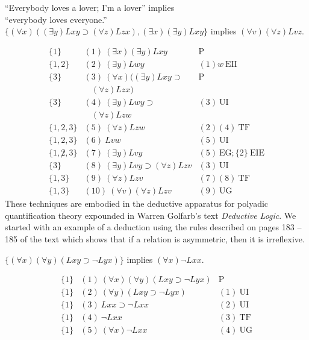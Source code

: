 \begin{center}
``Everybody loves a lover; I'm a lover'' implies \\
``everybody loves everyone.'' \\
$\{(\forall x) ((\exists y) Lxy \supset (\forall z) Lzx), (\exists x)(\exists
y) Lxy \}$ implies $(\forall v)(\forall z) Lvz.$
\end{center}
\[
\begin{array}{lll}
\{1\}   & (1)\  (\exists x)(\exists y) Lxy &  \mathrm{P}\\
\{1,2\}   & (2)\ (\exists y) Lwy  & (1)w\ \mathrm{EII}\\
\{3\}   & (3)\ (\forall x) ((\exists y) Lxy \supset   & 
\mathrm{P}\\
  &\ \ \ \  (\forall z) Lzx)  & \\
\{3\}   & (4)\ (\exists y) Lwy \supset   & (3)\ \mathrm{UI}\\
  &\ \ \ \ (\forall z) Lzw & \\
\{1,2,3\}   & (5)\ (\forall z) Lzw  & (2)(4)\ \mathrm{TF}\\
\{1,2,3\}   & (6)\ Lvw  & (5)\ \mathrm{UI}\\
\{1,\not 2,3\}   & (7)\ (\exists y) Lvy  & (5)\ \mathrm{EG};\{2\}\
\mathrm{EIE}\\ 
\{3\}   & (8)\ (\exists y) Lvy \supset (\forall z) Lzv  & (3)\ \mathrm{UI}\\
\{1,3\}   & (9)\  (\forall z) Lzv & (7)(8)\ \mathrm{TF}\\
\{1,3\}   & (10)\  (\forall v)(\forall z) Lzv & (9)\ \mathrm{UG}
\end{array}
\]
\fi
These techniques are embodied in the deductive apparatus for polyadic quantification theory expounded in Warren Golfarb's text \emph{Deductive Logic}. We started with an example of a deduction using the rules described on pages 183 -- 185 of the text
which shows that if a relation is asymmetric, then it is irreflexive.
\begin{center}
$\{(\forall x)(\forall y)(Lxy\supset\neg Lyx)\}$ implies $(\forall x)\neg Lxx.$
\end{center}
\[
\begin{array}{lll}
\{1\}   & (1)\  (\forall x)(\forall y)(Lxy\supset\neg Lyx) &  \mathrm{P}\\
\{1\}   & (2)\ (\forall y)(Lxy\supset\neg Lyx) & (1) \ \mathrm{UI}\\
\{1\}   & (3)\ Lxx\supset\neg Lxx &  (2)\ \mathrm{UI}\\
\{1\}   & (4)\ \neg Lxx   & (3)\ \mathrm{TF}\\
\{1\}   & (5)\ (\forall x) \neg Lxx  & (4)\ \mathrm{UG}
\end{array}
\]
